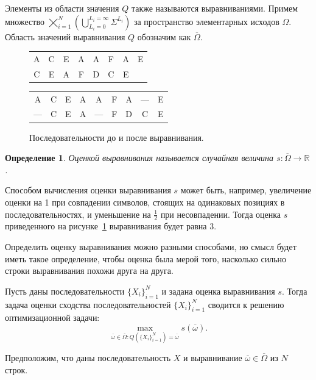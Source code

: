 \documentclass[specialist,
substylefile = spbu_report.rtx,
subf,href,colorlinks=true, 12pt]{disser}
\newtheorem{defenition}{Определение}
\begin{document}
		Элементы из области значения $Q$ также называются выравниваниями. Примем множество $\bigtimes_{i=1}^{N}(\bigcup_{L_i=0}^{L_i=\infty} \Sigma^{L_i})$ за пространство элементарных исходов $\Omega$. Область значений выравнивания $Q$ обозначим как $\overline \Omega$.
		
		\begin{figure}[H]
			\centering
			\begin{tabular}{cccccccc}
				A&C&E&A&A&F&A&E\\
				C&E&A&F&D&C&E&
			\end{tabular}
		\end{figure}
		\begin{figure}[H]
			\centering
			\begin{tabular}{ccccccccc}
				A&C&E&A&A&F&A&—&E\\
				—&C&E&A&—&F&D&C&E
			\end{tabular}
			\caption{Последовательности до и после выравнивания.} \label{fg:1}
		\end{figure}
		
		\begin{defenition}				
			Оценкой выравнивания называется случайная величина $s:\overline \Omega \rightarrow \mathbb{R}$.
		\end{defenition}	
		
		Способом вычисления оценки выравнивания $s$ может быть, например, увеличение оценки на 1 при совпадении символов, стоящих на одинаковых позициях в последовательностях, и уменьшение на $\frac{1}{2}$ при несовпадении. Тогда оценка $s$ приведенного на рисунке~\ref{fg:1} выравнивания будет равна 3.
						
		Определить оценку выравнивания можно разными способами, но смысл будет иметь такое определение, чтобы оценка была мерой того, насколько сильно строки выравнивания похожи друга на друга.
		
		Пусть даны последовательности $\{X_i\}_{i=1}^{N}$ и задана оценка выравнивания $s$. Тогда задача оценки сходства последовательностей $\{X_i\}_{i=1}^{N}$ сводится к решению оптимизационной задачи:		
		\begin{equation*}
			\max_{\overline{\omega} \in \overline{\Omega} : Q(\{X_i\}_{i=1}^{N}) = \overline{\omega}}s(\overline{\omega}). \label{eq:1}
		\end{equation*}	
	
		Предположим, что даны последовательность $X$ и выравнивание $\overline \omega \in \overline{\Omega}$ из $N$ строк. 
				
\end{document}
